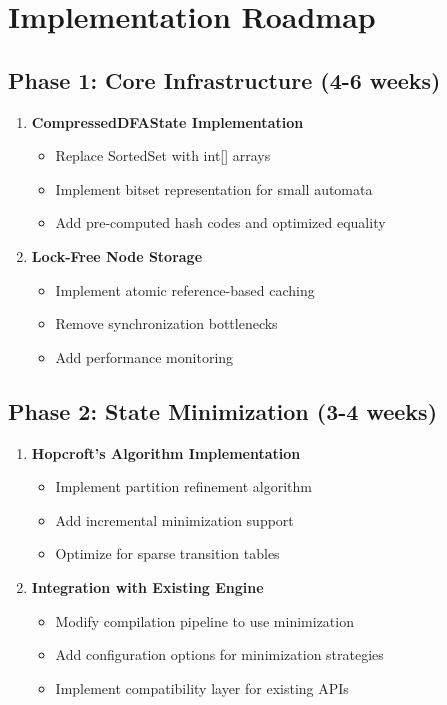 \documentclass[11pt,a4paper]{article}
\begin{document}
\section{Implementation Roadmap}

\subsection{Phase 1: Core Infrastructure (4-6 weeks)}

\begin{enumerate}
    \item \textbf{CompressedDFAState Implementation}
    \begin{itemize}
        \item Replace SortedSet with int[] arrays
        \item Implement bitset representation for small automata
        \item Add pre-computed hash codes and optimized equality
    \end{itemize}
    
    \item \textbf{Lock-Free Node Storage}
    \begin{itemize}
        \item Implement atomic reference-based caching
        \item Remove synchronization bottlenecks
        \item Add performance monitoring
    \end{itemize}
\end{enumerate}

\subsection{Phase 2: State Minimization (3-4 weeks)}

\begin{enumerate}
    \item \textbf{Hopcroft's Algorithm Implementation}
    \begin{itemize}
        \item Implement partition refinement algorithm
        \item Add incremental minimization support
        \item Optimize for sparse transition tables
    \end{itemize}
    
    \item \textbf{Integration with Existing Engine}
    \begin{itemize}
        \item Modify compilation pipeline to use minimization
        \item Add configuration options for minimization strategies
        \item Implement compatibility layer for existing APIs
    \end{itemize}
\end{enumerate}
\end{document}
